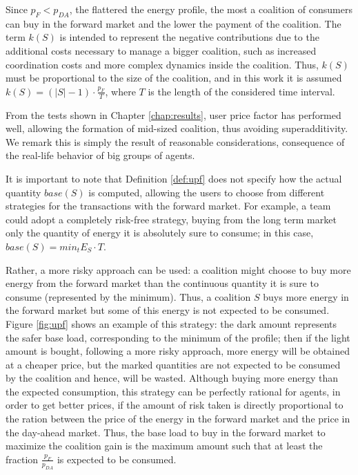 \documentclass[11pt, twoside, titlepage, a4paper, openright]{report}
\begin{document}
\noindent Since $p_{F}< p_{DA}$, the flattered the energy profile, the most a coalition of consumers can buy in the forward market and the lower the payment of the coalition.
The term $k\left(S\right)$ is intended to represent the negative contributions due to the additional costs necessary to manage a bigger coalition, such as increased coordination costs and more complex dynamics inside the coalition. Thus, $k(S)$ must be proportional to the size of the coalition, and in this work it is assumed $k(S)=(|S| - 1) \cdot\frac{p_{F}}{T}$, where $T$ is the length of the considered time interval. 

From the tests shown in Chapter \ref{chap:results}, user price factor has performed well, allowing the formation of mid-sized coalition, thus avoiding superadditivity. We remark this is simply the result of reasonable considerations, consequence of the real-life behavior of big groups of agents.

It is important to note that Definition \ref{def:upf} does not specify how the actual quantity $base(S)$ is computed, allowing the users to choose from different strategies for the transactions with the forward market. For example, a team could adopt a completely risk-free strategy, buying from the long term market only the quantity of energy it is absolutely sure to consume; in this case, $base(S)=min_t E_S\cdot T$.
\newpage

\noindent Rather, a more risky approach can be used: a coalition might choose to buy more energy from the forward market than the continuous quantity it is sure to consume (represented by the minimum). Thus, a coalition $S$ buys more energy in the forward market but some of this energy is not expected to be consumed. Figure \ref{fig:upf} shows an example of this strategy: the dark amount represents the safer base load, corresponding to the minimum of the profile; then if the light amount is bought, following a more risky approach, more energy will be obtained at a cheaper price, but the marked quantities are not expected to be consumed by the coalition and hence, will be wasted. Although buying more energy than the expected consumption, this strategy can be perfectly rational for agents, in order to get better prices, if the amount of risk taken is directly proportional to the ration between the price of the energy in the forward market and the price in the day-ahead market. Thus, the base load to buy in the forward market to maximize the coalition gain is the maximum amount such that at least the fraction $\frac{p_F}{p_{DA}}$ is expected to be consumed.
\end{document}
